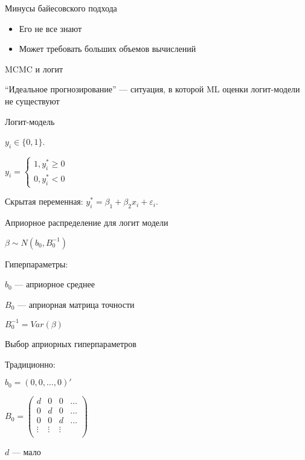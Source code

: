 \documentclass[ignorenonframetext,]{beamer}
\begin{document}
\begin{frame}{Минусы байесовского подхода}

\begin{itemize}
\item
  Его не все знают
\item
  Может требовать больших объемов вычислений
\end{itemize}

\end{frame}

\begin{frame}{MCMC и логит}

``Идеальное прогнозирование'' --- ситуация, в которой ML оценки
логит-модели не существуют

\end{frame}

\begin{frame}{Логит-модель}

\(y_i \in \{0,1\}\).

\(y_i=\begin{cases} 1, y^*_i \geq 0 \\ 0, y^*_i <0 \end{cases}\)

Скрытая переменная: \(y^*_i=\beta_1 +\beta_2 x_i +\varepsilon_i\).

\end{frame}

\begin{frame}{Априорное распределение для логит модели}

\(\beta \sim N(b_0, B_0^{-1})\)

Гиперпараметры:

\(b_0\) --- априорное среднее

\(B_0\) --- априорная матрица точности

\(B_0^{-1}=Var(\beta)\)

\end{frame}

\begin{frame}{Выбор априорных гиперпараметров}

Традиционно:

\(b_0 = (0, 0, \ldots, 0)'\)

\(B_0 = \begin{pmatrix} d & 0 & 0 & \ldots \\ 0 & d & 0 & \ldots \\ 0 & 0 & d & \ldots \\ \vdots & \vdots & \vdots & \\ \end{pmatrix}\)

\(d\) --- мало

\end{frame}
\end{document}
